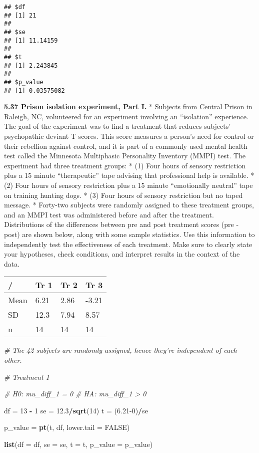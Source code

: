 \documentclass[]{book}
\newenvironment{Shaded}{\begin{snugshade}}{\end{snugshade}}
\newcommand{\CommentTok}[1]{\textcolor[rgb]{0.56,0.35,0.01}{\textit{#1}}}
\newcommand{\DataTypeTok}[1]{\textcolor[rgb]{0.13,0.29,0.53}{#1}}
\newcommand{\DecValTok}[1]{\textcolor[rgb]{0.00,0.00,0.81}{#1}}
\newcommand{\FloatTok}[1]{\textcolor[rgb]{0.00,0.00,0.81}{#1}}
\newcommand{\KeywordTok}[1]{\textcolor[rgb]{0.13,0.29,0.53}{\textbf{#1}}}
\newcommand{\NormalTok}[1]{#1}
\newcommand{\OperatorTok}[1]{\textcolor[rgb]{0.81,0.36,0.00}{\textbf{#1}}}
\newcommand{\OtherTok}[1]{\textcolor[rgb]{0.56,0.35,0.01}{#1}}
\newcommand{\StringTok}[1]{\textcolor[rgb]{0.31,0.60,0.02}{#1}}
\begin{document}
\begin{verbatim}
## $df
## [1] 21
## 
## $se
## [1] 11.14159
## 
## $t
## [1] 2.243845
## 
## $p_value
## [1] 0.03575082
\end{verbatim}

\textbf{5.37 Prison isolation experiment, Part I.}
* Subjects from Central Prison in Raleigh, NC, volunteered for an experiment involving an ``isolation'' experience. The goal of the experiment was to find a treatment that reduces subjects' psychopathic deviant T scores. This score measures a person's need for control or their rebellion against control, and it is part of a commonly used mental health test called the Minnesota Multiphasic Personality Inventory (MMPI) test. The experiment had three treatment groups:
* (1) Four hours of sensory restriction plus a 15 minute ``therapeutic'' tape advising that professional help is available.
* (2) Four hours of sensory restriction plus a 15 minute ``emotionally neutral'' tape on training hunting dogs.
* (3) Four hours of sensory restriction but no taped message.
* Forty-two subjects were randomly assigned to these treatment groups, and an MMPI test was administered before and after the treatment. Distributions of the differences between pre and post treatment scores (pre - post) are shown below, along with some sample statistics. Use this information to independently test the effectiveness of each treatment. Make sure to clearly state your hypotheses, check conditions, and interpret results in the context of the data.

\begin{longtable}[]{@{}llll@{}}
\toprule
/ & Tr 1 & Tr 2 & Tr 3\tabularnewline
\midrule
\endhead
Mean & 6.21 & 2.86 & -3.21\tabularnewline
SD & 12.3 & 7.94 & 8.57\tabularnewline
n & 14 & 14 & 14\tabularnewline
\bottomrule
\end{longtable}

\begin{Shaded}
\begin{Highlighting}[]
\CommentTok{# The 42 subjects are randomly assigned, hence they're independent of each other.}

\CommentTok{# Treatment 1 }

\CommentTok{# H0: mu_diff_1 = 0}
\CommentTok{# HA: mu_diff_1 > 0}

\NormalTok{df =}\StringTok{ }\DecValTok{13} \OperatorTok{-}\StringTok{ }\DecValTok{1} 
\NormalTok{se =}\StringTok{ }\FloatTok{12.3}\OperatorTok{/}\KeywordTok{sqrt}\NormalTok{(}\DecValTok{14}\NormalTok{)}
\NormalTok{t =}\StringTok{ }\NormalTok{(}\FloatTok{6.21}\DecValTok{-0}\NormalTok{)}\OperatorTok{/}\NormalTok{se}

\NormalTok{p_value =}\StringTok{ }\KeywordTok{pt}\NormalTok{(t, df, }\DataTypeTok{lower.tail =} \OtherTok{FALSE}\NormalTok{) }

\KeywordTok{list}\NormalTok{(}\DataTypeTok{df =}\NormalTok{ df, }\DataTypeTok{se =}\NormalTok{ se, }\DataTypeTok{t =}\NormalTok{ t, }\DataTypeTok{p_value =}\NormalTok{ p_value)}
\end{Highlighting}
\end{Shaded}
\end{document}
